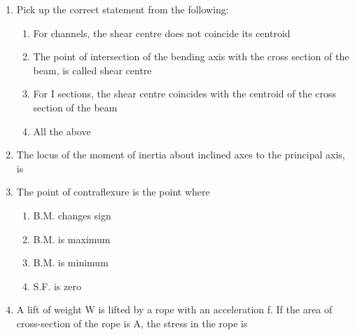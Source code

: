 \documentclass[11pt,a4paper]{article}
\begin{document}
\begin{enumerate}
\item{Pick up the correct statement from the following:}
\begin{enumerate}[label=\Alph*.]
\item{For channels, the shear centre does not coincide its centroid}
\item{The point of intersection of the bending axis with the cross section of the beam, is called shear centre}
\item{For I sections, the shear centre coincides with the centroid of the cross section of the beam}
\item{All the above}
\end{enumerate}
\item{The locus of the moment of inertia about inclined axes to the principal axis, is}
\\
\item{The point of contraflexure is the point where}
\begin{enumerate}[label=\Alph*.]
\item{B.M. changes sign}
\item{B.M. is maximum}
\item{B.M. is minimum}
\item{S.F. is zero}
\end{enumerate}
\item{A lift of weight W is lifted by a rope with an acceleration f. If the area of cross-section of the rope is A, the stress in the rope is}
\\

\end{enumerate}
\end{document}
